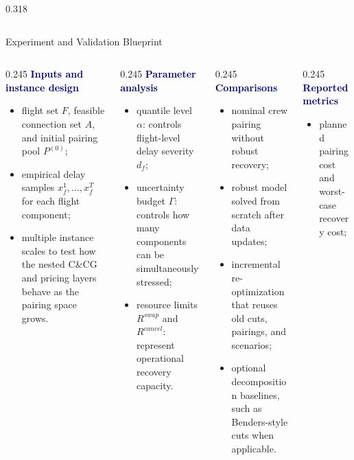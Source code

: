 \documentclass[final]{beamer}
\newcommand{\tightitem}{\setlength{\itemsep}{0.10em}\setlength{\parsep}{0pt}\setlength{\topsep}{0pt}}
\newcommand{\minihead}[1]{\vspace{0.12cm}\textbf{\textcolor{navy}{#1}}\par}
\begin{document}
\begin{frame}[t]
\begin{minipage}[t]{0.968\textwidth}
\begin{columns}[t,totalwidth=\linewidth]
\begin{column}{0.318\linewidth}
\end{column}
\end{columns}

\begin{block}{Experiment and Validation Blueprint}
\begin{columns}[T,totalwidth=\linewidth]
\begin{column}{0.245\linewidth}
\minihead{Inputs and instance design}
\begin{itemize}\tightitem
  \item flight set \(F\), feasible connection set \(A\), and initial pairing pool \(P^{(0)}\);
  \item empirical delay samples \(x_f^1,\ldots,x_f^T\) for each flight component;
  \item multiple instance scales to test how the nested C\&CG and pricing layers behave as the pairing space grows.
\end{itemize}
\end{column}
\begin{column}{0.245\linewidth}
\minihead{Parameter analysis}
\begin{itemize}\tightitem
  \item quantile level \(\alpha\): controls flight-level delay severity \(d_f\);
  \item uncertainty budget \(\Gamma\): controls how many components can be simultaneously stressed;
  \item resource limits \(R^{swap}\) and \(R^{cancel}\): represent operational recovery capacity.
\end{itemize}
\end{column}
\begin{column}{0.245\linewidth}
\minihead{Comparisons}
\begin{itemize}\tightitem
  \item nominal crew pairing without robust recovery;
  \item robust model solved from scratch after data updates;
  \item incremental re-optimization that reuses old cuts, pairings, and scenarios;
  \item optional decomposition baselines, such as Benders-style cuts when applicable.
\end{itemize}
\end{column}
\begin{column}{0.245\linewidth}
\minihead{Reported metrics}
\begin{itemize}\tightitem
  \item planned pairing cost and worst-case recovery cost;

\end{itemize}
\end{column}
\end{columns}
\end{block}
\end{minipage}
\end{frame}
\end{document}
